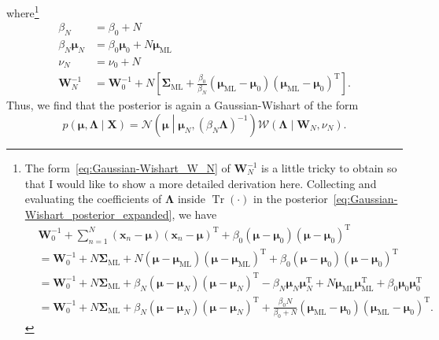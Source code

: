 \documentclass[12pt,a4paper]{article}
\begin{document}
where\footnote{%
The form~\eqref{eq:Gaussian-Wishart_W_N} of $\mathbf{W}_N^{-1}$ is a little tricky to obtain
so that I would like to show a more detailed derivation here.
Collecting and evaluating the coefficients of $\bm{\Lambda}$ inside $\operatorname{Tr}(\cdot)$
in the posterior~\eqref{eq:Gaussian-Wishart_posterior_expanded},
we have
\begin{align}
&
\mathbf{W}_0^{-1} +
\sum_{n=1}^{N}
\left(\mathbf{x}_n - \bm{\mu}\right)
\left(\mathbf{x}_n - \bm{\mu}\right)^{\operatorname{T}} +
\beta_0\left(\bm{\mu} - \bm{\mu}_0\right)\left(\bm{\mu} - \bm{\mu}_0\right)^{\operatorname{T}}
\\
&=
\mathbf{W}_0^{-1} +
N \bm{\Sigma}_{\text{ML}} +
N \left(\bm{\mu} - \bm{\mu}_{\text{ML}}\right)
\left(\bm{\mu} - \bm{\mu}_{\text{ML}}\right)^{\operatorname{T}} +
\beta_0\left(\bm{\mu} - \bm{\mu}_0\right)\left(\bm{\mu} - \bm{\mu}_0\right)^{\operatorname{T}}
\\
&=
\mathbf{W}_0^{-1} +
N \bm{\Sigma}_{\text{ML}} +
\beta_N
\left(\bm{\mu} - \bm{\mu}_N\right)
\left(\bm{\mu} - \bm{\mu}_N\right)^{\operatorname{T}}
- \beta_N \bm{\mu}_N \bm{\mu}_N^{\operatorname{T}}
+ N \bm{\mu}_{\text{ML}} \bm{\mu}_{\text{ML}}^{\operatorname{T}}
+ \beta_0 \bm{\mu}_0 \bm{\mu}_0^{\operatorname{T}}
\\
&=
\mathbf{W}_0^{-1} +
N \bm{\Sigma}_{\text{ML}} +
\beta_N
\left(\bm{\mu} - \bm{\mu}_N\right)
\left(\bm{\mu} - \bm{\mu}_N\right)^{\operatorname{T}} +
\frac{\beta_0 N}{\beta_0 + N}
\left(\bm{\mu}_{\text{ML}} - \bm{\mu}_0\right)
\left(\bm{\mu}_{\text{ML}} - \bm{\mu}_0\right)^{\operatorname{T}} .
\end{align}
}
\begin{align}
\beta_N &= \beta_0 + N \\
\beta_N\bm{\mu}_N &= \beta_0\bm{\mu}_0 + N\bm{\mu}_{\text{ML}} \\
\nu_N &= \nu_0 + N \\
\mathbf{W}_{N}^{-1} &= \mathbf{W}_{0}^{-1} +
N \left[
\bm{\Sigma}_{\text{ML}} +
\frac{\beta_0}{\beta_N}
\left(\bm{\mu}_{\text{ML}} - \bm{\mu}_0\right)
\left(\bm{\mu}_{\text{ML}} - \bm{\mu}_0\right)^{\operatorname{T}}
\right] .
\label{eq:Gaussian-Wishart_W_N}
\end{align}
Thus, we find that the posterior is again a Gaussian-Wishart of the form
\begin{equation}
p\left(\bm{\mu}, \bm{\Lambda}\middle|\mathbf{X}\right) =
\mathcal{N}\left(\bm{\mu}\middle|\bm{\mu}_N, \left(\beta_N\bm{\Lambda}\right)^{-1}\right)
\mathcal{W}\left(\bm{\Lambda}\middle|\mathbf{W}_N, \nu_N\right) .
\end{equation}
\end{document}
